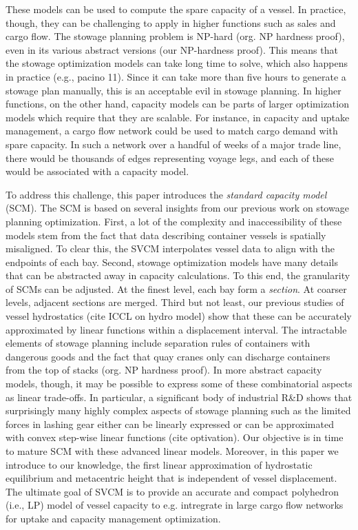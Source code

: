\documentclass[runningheads]{llncs}
\begin{document}
These models can be used to compute the spare capacity of a vessel. In practice, though, they can be challenging to apply in higher functions such as sales and cargo flow. The stowage planning problem is NP-hard (org. NP hardness proof), even in its various abstract versions (our NP-hardness proof). This means that the stowage optimization models can take long time to solve, which also happens in practice (e.g., pacino 11). Since it can take more than five hours to generate a stowage plan manually, this is an acceptable evil in stowage planning. In higher functions, on the other hand, capacity models can be parts of larger optimization models which require that they are scalable. For instance, in capacity and uptake management, a cargo flow network could be used to match cargo demand with spare capacity. In such a network over a handful of weeks of a major trade line, there would be thousands of edges representing voyage legs, and each of these would be associated with a capacity model. 

To address this challenge, this paper introduces the {\em standard capacity model} (SCM). The SCM is based on several insights from our previous work on stowage planning optimization. First, a lot of the complexity and inaccessibility of these models stem from the fact that data describing container vessels is spatially misaligned. To clear this, the SVCM interpolates vessel data to align with the endpoints of each bay. Second, stowage optimization models have many details that can be abstracted away in capacity calculations. To this end, the granularity of SCMs can be adjusted. At the finest level, each bay form a {\em section}. At coarser levels, adjacent sections are merged. Third but not least, our previous studies of vessel hydrostatics (cite ICCL on hydro model) show that these can be accurately approximated by linear functions within a displacement interval. The intractable elements of stowage planning include separation rules of containers with dangerous goods and the fact that quay cranes only can discharge containers from the top of stacks (org. NP hardness proof). In more abstract capacity models, though, it may be possible to express some of these combinatorial aspects as linear trade-offs. In particular, a significant body of industrial R\&D shows that surprisingly many highly complex aspects of stowage planning such as the limited forces in lashing gear either can be linearly expressed or can be approximated with convex step-wise linear functions (cite optivation). Our objective is in time to mature SCM with these advanced linear models. Moreover, in this paper we introduce to our knowledge, the first linear approximation of hydrostatic equilibrium and metacentric height that is independent of vessel displacement. The ultimate goal of SVCM is to provide an accurate and compact polyhedron (i.e., LP) model of vessel capacity to e.g. intregrate in large cargo flow networks for uptake and capacity management optimization.
\end{document}
